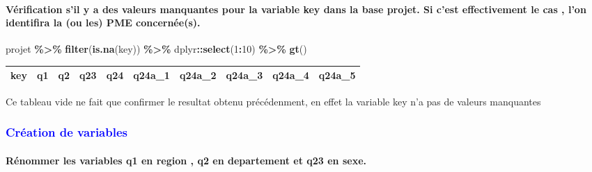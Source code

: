 \documentclass[
]{article}
\newenvironment{Shaded}{\begin{snugshade}}{\end{snugshade}}
\newcommand{\DecValTok}[1]{\textcolor[rgb]{0.00,0.00,0.81}{#1}}
\newcommand{\FunctionTok}[1]{\textcolor[rgb]{0.13,0.29,0.53}{\textbf{#1}}}
\newcommand{\NormalTok}[1]{#1}
\newcommand{\SpecialCharTok}[1]{\textcolor[rgb]{0.81,0.36,0.00}{\textbf{#1}}}
\begin{document}
\hfill\break

\hypertarget{vuxe9rification-sil-y-a-des-valeurs-manquantes-pour-la-variable-key-dans-la-base-projet.-si-cest-effectivement-le-cas-lon-identifira-la-ou-les-pme-concernuxe9es.}{%
\paragraph{Vérification s'il y a des valeurs manquantes pour la variable
key dans la base projet. Si c'est effectivement le cas , l'on identifira
la (ou les) PME
concernée(s).}\label{vuxe9rification-sil-y-a-des-valeurs-manquantes-pour-la-variable-key-dans-la-base-projet.-si-cest-effectivement-le-cas-lon-identifira-la-ou-les-pme-concernuxe9es.}}

\hfill\break

\begin{Shaded}
\begin{Highlighting}[]
\NormalTok{projet }\SpecialCharTok{\%\textgreater{}\%} 
  \FunctionTok{filter}\NormalTok{(}\FunctionTok{is.na}\NormalTok{(key)) }\SpecialCharTok{\%\textgreater{}\%}
\NormalTok{  dplyr}\SpecialCharTok{::}\FunctionTok{select}\NormalTok{(}\DecValTok{1}\SpecialCharTok{:}\DecValTok{10}\NormalTok{) }\SpecialCharTok{\%\textgreater{}\%}
       \FunctionTok{gt}\NormalTok{()}
\end{Highlighting}
\end{Shaded}

\begin{longtable}{llllrrrrrr}
\toprule
key & q1 & q2 & q23 & q24 & q24a\_1 & q24a\_2 & q24a\_3 & q24a\_4 & q24a\_5 \\ 
\midrule
\bottomrule
\end{longtable}

\hfill\break

Ce tableau vide ne fait que confirmer le resultat obtenu précédenment,
en effet la variable key n'a pas de valeurs manquantes

\textcolor{blue}{\subsubsection{Création de variables}}

\hypertarget{ruxe9nommer-les-variables-q1-en-region-q2-en-departement-et-q23-en-sexe.}{%
\paragraph{Rénommer les variables q1 en region , q2 en departement et
q23 en
sexe.}\label{ruxe9nommer-les-variables-q1-en-region-q2-en-departement-et-q23-en-sexe.}}
\end{document}
